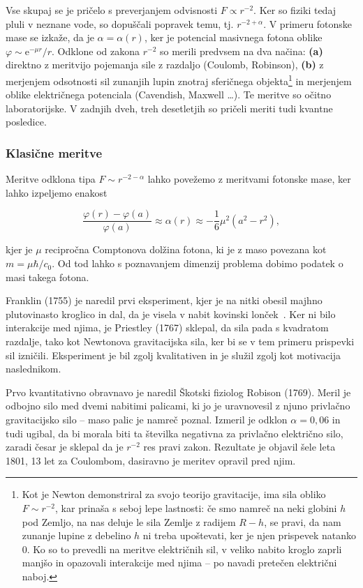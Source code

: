 \documentclass[a4paper, twocolumn, titlepage]{article}
\begin{document}
Vse skupaj se je pričelo s preverjanjem odvisnosti $F \propto r^{-2}$. Ker so fiziki tedaj pluli v neznane vode, so dopuščali
popravek temu, tj. $r^{-2 + \alpha}$. V primeru fotonske mase se izkaže, da je $\alpha = \alpha (r)$, ker je potencial
masivnega fotona oblike $\varphi \sim \text{e}^{-\mu r}/r$. Odklone od zakona $r^{-2}$ so merili predvsem na dva načina:
\textbf{(a)} direktno z meritvijo pojemanja sile z razdaljo (Coulomb, Robinson), \textbf{(b)} z merjenjem odsotnosti sil
zunanjih lupin znotraj sferičnega objekta\footnote{Kot je Newton demonstriral za svojo teorijo gravitacije, ima sila obliko
$F \sim r^{-2}$, kar prinaša s seboj lepe lastnosti: če smo namreč na neki globini $h$ pod Zemljo, na nas deluje le sila
Zemlje z radijem $R - h$, se pravi, da nam zunanje lupine z debelino $h$ ni treba upoštevati, ker je njen prispevek natanko
0. Ko so to prevedli na meritve električnih sil, v veliko nabito kroglo zaprli manjšo in opazovali interakcije med njima --
po navadi pretečen električni naboj.} in merjenjem oblike električnega potenciala (Cavendish, Maxwell \ldots). Te meritve so
očitno laboratorijske. V zadnjih dveh, treh desetletjih so pričeli meriti tudi kvantne posledice.

\subsubsection{Klasične meritve}

Meritve odklona tipa $F \sim r^{-2 - \alpha}$ lahko povežemo z meritvami fotonske mase, ker lahko izpeljemo
enakost~\cite{over}

\begin{equation}
	\frac{\varphi(r) - \varphi(a)}{\varphi(a)} \approx \alpha(r) \approx -\frac{1}{6}\mu^2(a^2 - r^2),
\end{equation}

kjer je $\mu$ recipročna Comptonova dolžina fotona, ki je z maso povezana kot $m = \mu\hbar/c_0$. Od tod lahko s poznavanjem
dimenzij problema dobimo podatek o masi takega fotona.

Franklin (1755) je naredil prvi eksperiment, kjer je na nitki obesil majhno plutovinasto kroglico in dal, da je visela v nabit
kovinski lonček~\cite{over}. Ker ni bilo interakcije med njima, je Priestley (1767) sklepal, da sila pada s kvadratom
razdalje, tako kot Newtonova gravitacijska sila, ker bi se v tem primeru prispevki sil izničili. Eksperiment je bil zgolj
kvalitativen in je služil zgolj kot motivacija naslednikom.

Prvo kvantitativno obravnavo je naredil Škotski fiziolog Robison (1769). Meril je odbojno silo med dvemi nabitimi palicami,
ki jo je uravnovesil z njuno privlačno gravitacijsko silo -- maso palic je namreč poznal. Izmeril je odklon $\alpha = 0,06$
in tudi ugibal, da bi morala biti ta številka negativna za privlačno električno silo, zaradi česar je sklepal da je $r^{-2}$
res pravi zakon. Rezultate je objavil šele leta 1801, 13 let za Coulombom, dasiravno je meritev opravil pred njim.
\end{document}
